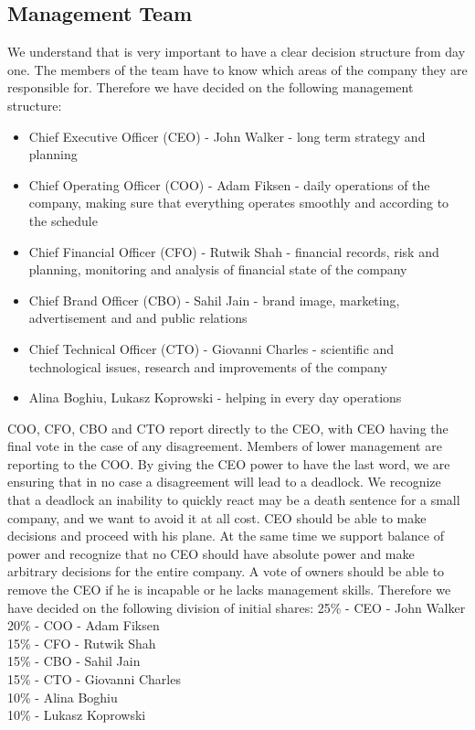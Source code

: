 \documentclass[11pt]{article}
\begin{document}
  \subsection{Management Team}
  We understand that is very important to have a clear decision structure from day one.
  The members of the team have to know which areas of the company they are responsible for.
  Therefore we have decided on the following management structure:
  \begin{itemize}
  \item Chief Executive Officer (CEO) - John Walker - long term strategy and planning\\
  \item Chief Operating Officer (COO) - Adam Fiksen - daily operations of the company, making sure that everything operates smoothly and according to the schedule\\
  \item Chief Financial Officer (CFO) - Rutwik Shah - financial records, risk and planning, monitoring and analysis of financial state of the company\\
  \item Chief Brand Officer (CBO) - Sahil Jain - brand image, marketing, advertisement and and public relations\\
  \item Chief Technical Officer (CTO) - Giovanni Charles - scientific and technological issues, research and improvements of the company\\
  \item Alina Boghiu, Lukasz Koprowski - helping in every day operations\\
  \end{itemize}

  COO, CFO, CBO and CTO report directly to the CEO, with CEO having the final vote in the case of any disagreement.
  Members of lower management are reporting to the COO.
  By giving the CEO power to have the last word, we are ensuring that in no case a disagreement will lead to a deadlock.
  We recognize that a deadlock an inability to quickly react may be a death sentence for a small company, and we want to avoid it at all cost.
  CEO should be able to make decisions and proceed with his plane.
  At the same time we support balance of power and recognize that no CEO should have absolute power and make arbitrary decisions for the entire company.
  A vote of owners should be able to remove the CEO if he is incapable or he lacks management skills.
  Therefore we have decided on the following division of initial shares:
    25\% - CEO - John Walker\\
    20\% - COO - Adam Fiksen\\
    15\% - CFO - Rutwik Shah\\
    15\% - CBO - Sahil Jain\\
    15\% - CTO - Giovanni Charles\\
    10\% - Alina Boghiu\\
    10\% - Lukasz Koprowski\\
\end{document}
